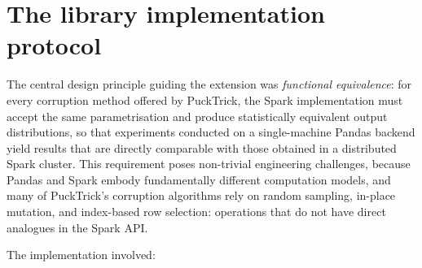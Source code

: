 
\newpage

\section{The library implementation protocol}


The central design principle guiding the extension was \emph{functional equivalence}: for every corruption method offered by PuckTrick, the Spark implementation must accept the same parametrisation and produce statistically equivalent output distributions, so that experiments conducted on a single-machine Pandas backend yield results that are directly comparable with those obtained in a distributed Spark cluster.  This requirement poses non-trivial engineering challenges, because Pandas and Spark embody fundamentally different computation models, and many of PuckTrick's corruption algorithms rely on random sampling, in-place mutation, and index-based row selection: operations that do not have direct analogues in the Spark API.

The implementation involved:

